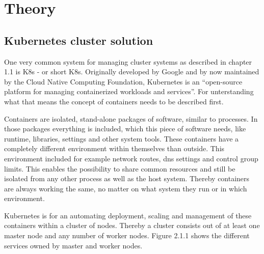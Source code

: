 \chapter{Theory}

\section{Kubernetes cluster solution}

One very common system for managing cluster systems as described in chapter 1.1 is \acl{K8s} - or short \acs{K8s}. Originally developed by Google and by now maintained by the Cloud Native Computing Foundation, Kubernetes is an ``open-source platform for managing containerized workloads and services''. For unterstanding what that means the concept of containers needs to be described first.


Containers are isolated, stand-alone packages of software, similar to processes. In those packages everything is included, which this piece of software needs, like runtime, libraries, settings and other system tools.  These containers have a completely different environment within themselves than outside. This environment included for example network routes, dns settings and control group limits. This enables the possibility to share common resources and still be isolated from any other process as well as the host system. Thereby containers are always working the same, no matter on what system they run or in which environment.


Kubernetes is for an automating deployment, scaling and management of these containers within a cluster of nodes. Thereby a cluster consists out of at least one master node and any number of worker nodes. Figure 2.1.1 shows the different services owned by master and worker nodes.

